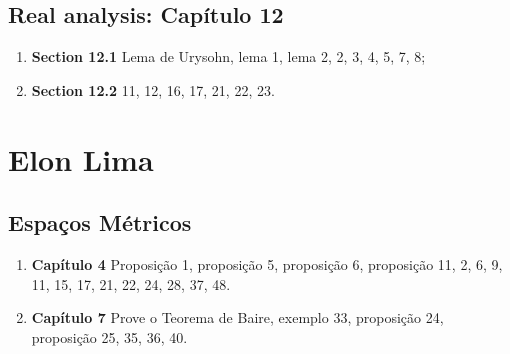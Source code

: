 \documentclass[latin,20pt]{article}
\begin{document}
  \subsection*{Real analysis: Capítulo 12}
    \begin{enumerate}
    \item {\bf Section 12.1} Lema de Urysohn, lema 1, lema 2, 2, 
    3, 4, 5, 7, 8;
    \item {\bf Section 12.2} 11, 12, 16, 17, 21, 22, 23.
    \end{enumerate}  
  \section*{Elon Lima}
  \subsection*{Espaços Métricos} 
   \begin{enumerate}
    \item {\bf Capítulo 4} Proposição 1, proposição 5, proposição 6, 
    proposição 11, 2, 6, 9, 11, 15, 17, 21, 22, 24, 28, 37, 48. 
    \item {\bf Capítulo 7} Prove o Teorema de Baire, exemplo 33, 
    proposição 24, proposição 25, 35, 36, 40. 
   \end{enumerate} 
\end{document}
